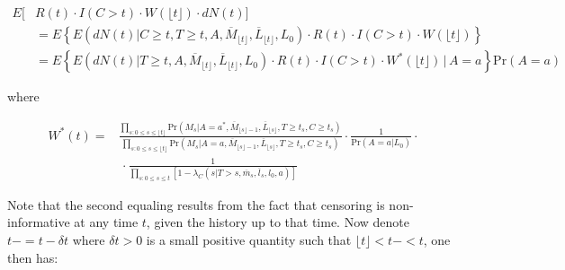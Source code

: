 \documentclass[AMA,STIX1COL]{WileyNJD-v2}
\newcommand{\pr}{\text{Pr}}
\begin{document}
\begingroup
\fontsize{10pt}{10pt}\selectfont
\begin{align*}
E[&R(t)\cdot I(C>t)\cdot W(\lfloor t \rfloor) \cdot dN(t)]\\
&= E \left\{E(dN(t) | C\ge t, T\ge t, A, \overline{M}_{\lfloor t \rfloor}, \overline{L}_{\lfloor t \rfloor}, L_{0})\cdot R(t)\cdot I(C>t) \cdot W(\lfloor t \rfloor) \right\}\\
&=E \left\{E(dN(t) | T\ge t, A, \overline{M}_{\lfloor t\rfloor }, \overline{L}_{\lfloor t \rfloor }, L_{0}) \cdot R(t) \cdot I(C>t) \cdot W^*(\lfloor t \rfloor)\,\bigg\rvert\,A=a \right\}\pr(A=a)
\end{align*}
\endgroup

where 

\begingroup
\fontsize{10pt}{10pt}\selectfont
\begin{align*}
W^*(t) =& \frac{\prod_{s: 0\le s \le \lfloor t \rfloor} \pr(M_{s}|A = a^*, \overline{M}_{\lfloor s \rfloor-1}, \overline{L}_{\lfloor s \rfloor}, T\ge t_s, C \ge t_s)}{\prod_{s: 0\le s \le \lfloor t \rfloor} \pr(M_{s}|A = a, \overline{M}_{\lfloor s\rfloor-1}, \overline{L}_{\lfloor s \rfloor}, T\ge t_s, C \ge t_s)}\cdot \frac{1}{\pr(A=a|L_{0})}\cdot\\
&\,\cdot\frac{1}{\prod_{s: 0\le s \le t} \left[1- \lambda_C(s|T>s, \overline{m}_{s }, \overline{l}_{s},l_{0},a)\right]}
\end{align*}
\endgroup

Note that the second equaling results from the fact that censoring is non-informative at any time $t$, given the history up to that time. Now denote $t-=t - \delta t$ where $\delta t > 0$ is a small positive quantity such that $\lfloor t \rfloor < t-<t$, one then has:
\end{document}
